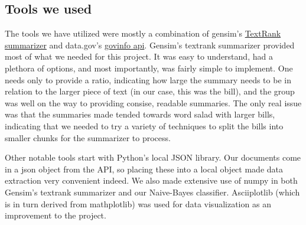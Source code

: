 \documentclass[11pt,a4paper]{article}
\begin{document}
\subsection{Tools we used}
The tools we have utilized were mostly a combination of gensim's 
 \href{https://radimrehurek.com/gensim/summarization/summariser.html}{TextRank summarizer} and data.gov's
 \href{https://api.govinfo.gov/docs/}{govinfo api}.
 Gensim's textrank summarizer provided most of what we needed for this project.  It was easy to understand, had a plethora of options, and most importantly, was fairly simple to implement.  
 \newline\indent One needs only to provide a ratio, indicating how large the summary needs to be in relation to the larger piece of text (in our case, this was the bill), and the group was well on the way to providing consise, readable summaries.  The only real issue was that the summaries made tended towards word salad with larger bills, indicating that we needed to try a variety of techniques to split the bills into smaller chunks for the summarizer to process.
 
 Other notable tools start with Python's local JSON library. Our documents come in a json object from the API, so placing these into a local object made data extraction very convenient indeed. We also made extensive use of numpy in both Gensim's textrank summarizer and our Naive-Bayes classifier. Asciiplotlib (which is in turn derived from mathplotlib) was used for data visualization as an improvement to the project.
\end{document}
